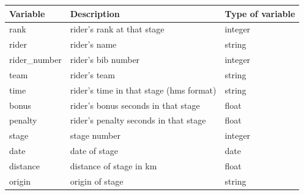\documentclass[aos,preprint]{imsart}
\begin{document}
\begin{table}[ht]
\centering
\begin{tabular}{lll}
\textbf{Variable} & \textbf{Description}                                                                                                  & \textbf{Type of variable} \\ \hline
rank              & rider's rank at that stage                                                                                            & integer                   \\
rider             & rider's name                                                                                                          & string                    \\
rider\_number     & rider's bib number                                                                                                    & integer                   \\
team              & rider's team                                                                                                          & string                    \\
time              & rider's time in that stage (hms format)                                                                               & string                    \\
bonus             & rider's bonus seconds in that stage                                                                                   & float                     \\
penalty           & rider's penalty seconds in that stage                                                                                 & float                     \\
stage             & stage number                                                                                                          & integer                   \\
date              & date of stage                                                                                                         & date                      \\
distance          & distance of stage in km                                                                                               & float                     \\
origin            & origin of stage                                                                                                       & string                    \\

\end{tabular}
\end{table}
\end{document}
